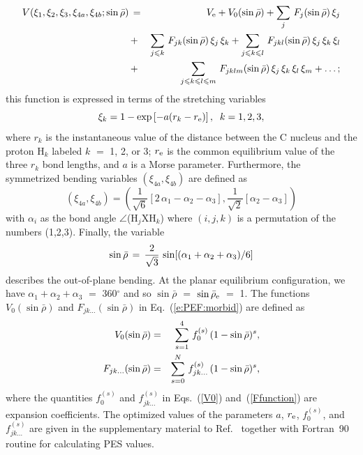 \documentclass{achemso}
\renewcommand{\eqref}[1]{(\ref{#1})}
\newcommand{\3}{$_{3}$}
\begin{document}
\begin{eqnarray}
V(\xi_1,\xi_2,\xi_3,\xi_{4a},\xi_{4b};{\sin\bar \rho}) \,
    &=&  V_{\rm e} +  V_0({\sin\bar \rho}) + \sum_j \, F_j({\sin\bar \rho}) \, \xi_j
\nonumber \\
& + &
       \sum_{j \leqslant  k} \, F_{jk}({\sin\bar \rho}) \, \xi_j \, \xi_k
%
       +  \sum_{j \leqslant k \leqslant l} \, F_{jkl}({\sin\bar \rho}) \,\xi_j \, \xi_k \, \xi_l
\nonumber \\
       &+ & \sum_{j \leqslant k \leqslant l \leqslant m} \, F_{jklm}({\sin\bar \rho}) \, \xi_j \, \xi_k \,
        \xi_l \, \xi_m + \dots;
\label{e:PEF:morbid}
\end{eqnarray}
this function is expressed in terms of the stretching variables
\begin{equation}
\xi_k =
1 - \exp\left[ -a ( r_k - r_{\rm e}) \right], \;\; k=1,2,3,
\end{equation}
where
 $r_k$ is the instantaneous value of the distance
between the C nucleus
 and the proton H$_k$
labeled $k$ $=$ 1, 2, or 3;
$r_{\rm e}$ is the common equilibrium value of
the three $r_k$ bond lengths,
and $a$ is a Morse parameter.
Furthermore,
the symmetrized bending variables
$( \xi_{4a}, \xi_{4b} )$ are defined as
\begin{equation}
\label{S4a4b}
\left( \xi_{4a}, \xi_{4b} \right) =
\left(
  \frac{1}{\sqrt{6}} [2 \, \alpha_{1} - \alpha_{2} - \alpha_{3} ],
 \frac{1}{\sqrt{2}} [\alpha_{2} - \alpha_{3} ]
\right)
\end{equation}
with
$\alpha_i$ as      the bond angle $\angle$(H$_j$XH$_k$) where $(i,j,k)$ is a
permutation of the numbers (1,2,3).
Finally,
the variable
\begin{equation}
\label{e:sin:brho} \sin {\bar \rho} \, = \, \frac{2}{\sqrt{3}} \,
\sin [
   (\alpha_1 + \alpha_2 + \alpha_3) /6] \hbox{}
\end{equation}
describes  the out-of-plane bending.
At the planar equilibrium configuration, we have
   $\alpha_1 + \alpha_2 + \alpha_3$ $=$ 360$^\circ$ and so
$\sin {\bar \rho}$ $=$
$\sin {\bar \rho}_{\rm e}$ $=$ 1.
The functions $V_0({\sin\bar \rho})$ and  $F_{jk\dots}({\sin\bar \rho})$
in Eq.~\eqref{e:PEF:morbid} are defined as
\begin{eqnarray}
\label{V0}
   V_0({\sin\bar \rho}) &=& \sum_{s=1}^{4} \, f_0^{(s)} \, (1           - \sin {\bar \rho})^s \hbox{,} \\
\label{Ffunction}
  F_{jk\dots}({\sin\bar \rho}) &=& \sum_{s=0}^{N}\, f_{jk\dots}^{(s)} \, (1 - \sin {\bar \rho})^s \hbox{,}
\end{eqnarray}
where
the quantities  $f_0^{(s)}$ and $f_{jk\dots}^{(s)}$ in
Eqs.~(\ref{V0}) and~(\ref{Ffunction}) are expansion coefficients.
 The optimized values of the parameters
$a$,
$r_{\rm e}$,
 $f_0^{(s)}$, and $f_{jk\dots}^{(s)}$
are given in the supplementary material to
 Ref.~ together with
 Fortran~90 routine for calculating PES values.
\end{document}
